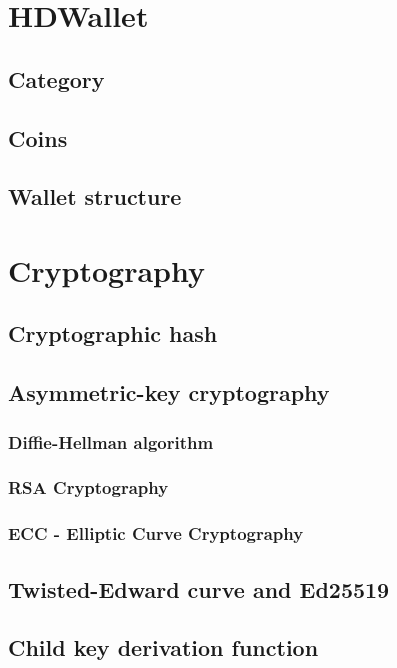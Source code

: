 \section{HDWallet}
\label{sec:hd_wallet}



\subsection{Category}

\subsection{Coins}

\subsection{Wallet structure}

\section{Cryptography}

\subsection{Cryptographic hash}
\label{sec:crypto_hash}

\subsection{Asymmetric-key cryptography}
\label{sec:asymmetric_cryptography}

\subsubsection{Diffie-Hellman algorithm}

\subsubsection{RSA Cryptography}

\subsubsection{ECC - Elliptic Curve Cryptography}

\subsection{Twisted-Edward curve and Ed25519}

\subsection{Child key derivation function}
